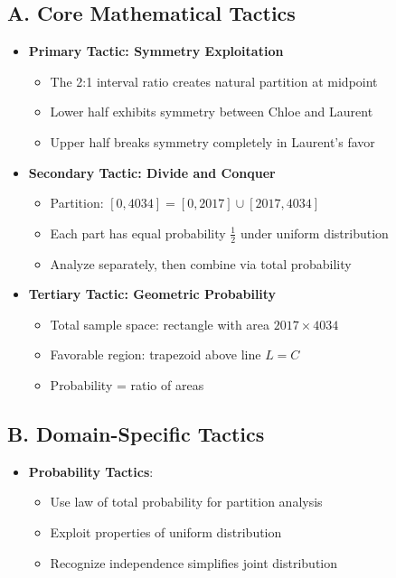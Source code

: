 \documentclass[]{article}
\begin{document}
\begin{tacticalbox}
\subsection*{A. Core Mathematical Tactics}
\begin{itemize}[leftmargin=*]
    \item \textbf{Primary Tactic: Symmetry Exploitation}
    \begin{itemize}
        \item The 2:1 interval ratio creates natural partition at midpoint
        \item Lower half exhibits symmetry between Chloe and Laurent
        \item Upper half breaks symmetry completely in Laurent's favor
    \end{itemize}
    
    \item \textbf{Secondary Tactic: Divide and Conquer}
    \begin{itemize}
        \item Partition: $[0, 4034] = [0, 2017] \cup [2017, 4034]$
        \item Each part has equal probability $\frac{1}{2}$ under uniform distribution
        \item Analyze separately, then combine via total probability
    \end{itemize}
    
    \item \textbf{Tertiary Tactic: Geometric Probability}
    \begin{itemize}
        \item Total sample space: rectangle with area $2017 \times 4034$
        \item Favorable region: trapezoid above line $L = C$
        \item Probability = ratio of areas
    \end{itemize}
\end{itemize}

\subsection*{B. Domain-Specific Tactics}
\begin{itemize}[leftmargin=*]
    \item \textbf{Probability Tactics}:
    \begin{itemize}
        \item Use law of total probability for partition analysis
        \item Exploit properties of uniform distribution
        \item Recognize independence simplifies joint distribution
    \end{itemize}
    

\end{itemize}
\end{tacticalbox}
\end{document}
